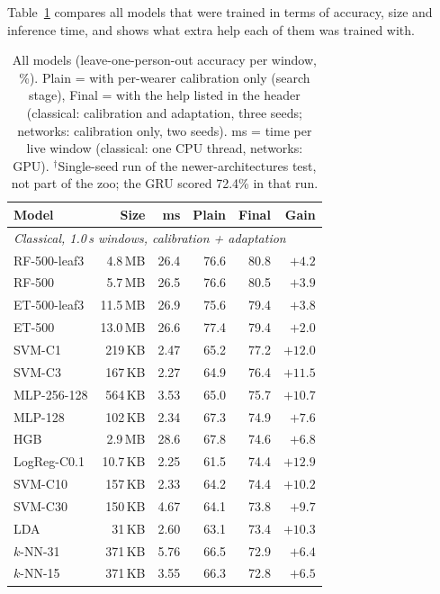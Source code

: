 \documentclass[conference]{IEEEtran}
\begin{document}
Table~\ref{tab:models} compares all models that were trained in terms of accuracy,
size and inference time, and shows what extra help each of them was trained with.

\begin{table}[!htb]
  \caption{All models (leave-one-person-out accuracy per window, \%). Plain = with
  per-wearer calibration only (search stage), Final = with the help listed in the
  header (classical: calibration and adaptation, three seeds; networks: calibration
  only, two seeds). ms = time per live window (classical: one CPU thread, networks:
  GPU). $^\dagger$Single-seed run of the newer-architectures test, not part of the
  zoo; the GRU scored 72.4\% in that run.}
  \label{tab:models}
  \centering
  \footnotesize
  \setlength{\tabcolsep}{2.6pt}
  \begin{tabular}{lrrrrr}
    \hline
    Model & Size & ms & Plain & Final & Gain \\
    \hline
    \multicolumn{6}{l}{\textit{Classical, 1.0\,s windows, calibration + adaptation}} \\
    RF-500-leaf3  & 4.8\,MB & 26.4 & 76.6 & 80.8 & $+4.2$ \\
    RF-500        & 5.7\,MB & 26.5 & 76.6 & 80.5 & $+3.9$ \\
    ET-500-leaf3  & 11.5\,MB & 26.9 & 75.6 & 79.4 & $+3.8$ \\
    ET-500        & 13.0\,MB & 26.6 & 77.4 & 79.4 & $+2.0$ \\
    SVM-C1        & 219\,KB & 2.47 & 65.2 & 77.2 & $+12.0$ \\
    SVM-C3        & 167\,KB & 2.27 & 64.9 & 76.4 & $+11.5$ \\
    MLP-256-128   & 564\,KB & 3.53 & 65.0 & 75.7 & $+10.7$ \\
    MLP-128       & 102\,KB & 2.34 & 67.3 & 74.9 & $+7.6$ \\
    HGB           & 2.9\,MB & 28.6 & 67.8 & 74.6 & $+6.8$ \\
    LogReg-C0.1   & 10.7\,KB & 2.25 & 61.5 & 74.4 & $+12.9$ \\
    SVM-C10       & 157\,KB & 2.33 & 64.2 & 74.4 & $+10.2$ \\
    SVM-C30       & 150\,KB & 4.67 & 64.1 & 73.8 & $+9.7$ \\
    LDA           & 31\,KB & 2.60 & 63.1 & 73.4 & $+10.3$ \\
    $k$-NN-31     & 371\,KB & 5.76 & 66.5 & 72.9 & $+6.4$ \\
    $k$-NN-15     & 371\,KB & 3.55 & 66.3 & 72.8 & $+6.5$ \\

\end{tabular}
\end{table}
\end{document}
